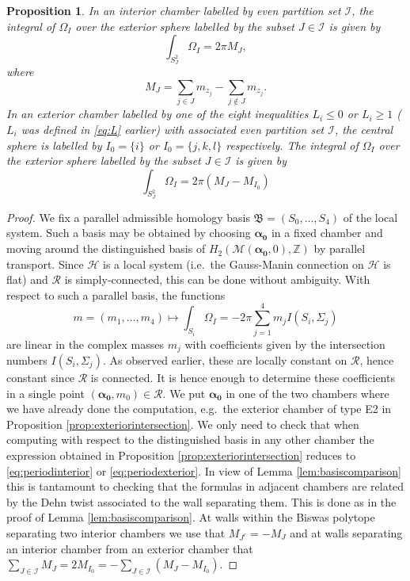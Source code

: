 \documentclass[12pt,letterpaper,reqno]{amsart}
\def\mathbf#1{#1}%
\newtheorem{prop}[thm]{Proposition}
\theoremstyle{remark}
\theoremstyle{definition}
\numberwithin{thm}{section}
\numberwithin{equation}{section}
\numberwithin{figure}{section}
\newcommand{\Z}{\ensuremath{\mathbb Z}}
\begin{document}
\begin{prop}\label{prop:integralofOmegaI}
In an interior chamber labelled by even partition set $\mathcal{I}$, the integral of $\Omega_I$ over the exterior sphere labelled by the subset $J \in \mathcal{I}$ is given by 
\begin{equation}\label{eq:periodinterior}
\int_{S^2_J} \Omega_I = 2\pi M_J,
\end{equation}
where 
\[M_J = \sum_{j \in J} m_{z_j} -\sum_{j \notin J} m_{z_j}.\]
In an exterior chamber labelled by one of the eight inequalities $L_i \leq 0$ or $L_i \geq 1$ ($L_i$ was defined in \eqref{eq:L} earlier) with associated even partition set $\mathcal{I}$, 
the central sphere is labelled by $I_0=\{i\}$ or $I_0=\{j,k,l\}$ respectively.  
The integral of $\Omega_I$ over the exterior sphere labelled by the subset $J \in \mathcal{I}$ is given by 
\begin{equation}\label{eq:periodexterior}
\int_{S^2_J} \Omega_I = 2\pi \left(M_J- M_{I_0}\right)
\end{equation}
 \end{prop}

\begin{proof}
We fix a parallel admissible homology basis  $\mathfrak{B}=(S_0, \ldots ,S_4)$ of the local system. Such a basis may be obtained by choosing $\boldsymbol{\alpha_0}$ in a fixed chamber and moving around the distinguished basis of $H_2(\mathcal{M}(\boldsymbol{\alpha_0}, 0),\Z)$ by parallel transport. Since $\mathcal{H}$ is a local system (i.e.\ the Gauss-Manin connection on $\mathcal{H}$ is flat) and $\mathcal{R}$ is simply-connected, this can be done without ambiguity. With respect to such a parallel basis, the functions
\[
\mathbf{m}=(m_1, \dots, m_4) \mapsto \int_{S_i} \Omega_I =  -2 \pi \sum_{j=1}^4 m_j  I(S_i, \Sigma_j)
\]
are linear in the complex masses $m_j$ with coefficients given by the intersection numbers $I(S_i, \Sigma_j)$. As observed earlier, these are locally constant on $\mathcal R$, hence constant since $\mathcal R$ is connected. It is hence enough to determine these coefficients in a single point $(\boldsymbol{\alpha_0}, \mathbf{m_0}) \in \mathcal{R}$. We put $\boldsymbol{\alpha_0}$ in one of the two chambers where we have already done the computation, e.g.\ the exterior chamber of type E2 in Proposition \ref{prop:exteriorintersection}. We only need to check that when computing with respect to the distinguished basis in any other chamber the expression obtained in Proposition \ref{prop:exteriorintersection} reduces to \eqref{eq:periodinterior} or \eqref{eq:periodexterior}. In view of Lemma \ref{lem:basiscomparison} this is tantamount to checking that the formulas in adjacent chambers are related by the Dehn twist associated to the wall separating them. This is done as in the proof of Lemma \ref{lem:basiscomparison}. At walls within the Biswas polytope separating two interior chambers we use that $M_{J^c} = - M_J$ and at walls separating an interior chamber from an exterior chamber that $ \sum_{J \in \mathcal{I}} M_J  = 2M_{I_0} = - \sum_{J \in \mathcal{I}} (M_J - M_{I_0})$. 
\end{proof}
\end{document}
